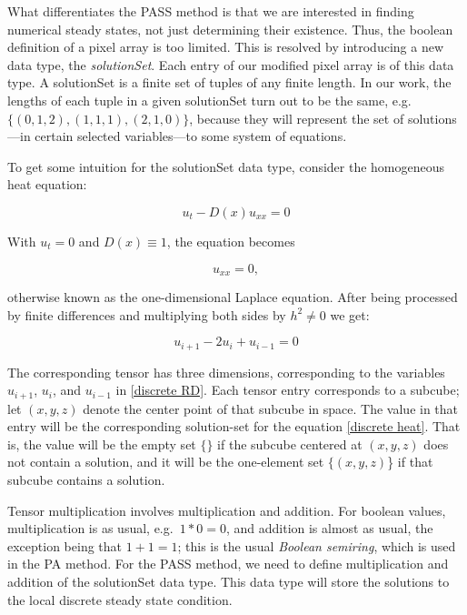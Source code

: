 \documentclass[11pt]{article}
\begin{document}
What differentiates the PASS method is that we are interested in finding numerical steady states, not just determining their existence. Thus, the boolean definition of a pixel array is too limited. This is resolved by introducing a new data type, the \textit{solutionSet}. Each entry of our modified pixel array is of this data type. A solutionSet is a finite set of tuples of any finite length. In our work, the lengths of each tuple in a given solutionSet turn out to be the same, e.g.\  $\{(0,1,2), (1,1,1), (2,1,0)\}$, because they will represent the set of solutions---in certain selected variables---to some system of equations.

To get some intuition for the solutionSet data type, consider the homogeneous heat equation:

\begin{equation}
    \label{general homogeneous heat}
    u_t - D(x)u_{xx} = 0
\end{equation}

\noindent With $u_t = 0$ and $D(x) \equiv 1$, the equation becomes

\begin{equation}
    \label{homogeneous heat}
    u_{xx} = 0,
\end{equation}

\noindent otherwise known as the one-dimensional Laplace equation. After being processed by finite differences and multiplying both sides by $h^2 \ne 0$ we get: 

\begin{equation}
    \label{discrete heat}
    u_{i+1} - 2u_i + u_{i-1} = 0
\end{equation}

\noindent The corresponding tensor has three dimensions, corresponding to the variables $u_{i+1}$, $u_i$, and $u_{i-1}$ in \cref{discrete RD}. Each tensor entry corresponds to a subcube; let $(x,y,z)$ denote the center point of that subcube in space. The value in that entry will be the corresponding solution-set for the equation \cref{discrete heat}. That is, the value will be the empty set $\{\}$ if the subcube centered at $(x,y,z)$ does not contain a solution, and it will be the one-element set $\{(x,y,z)$\} if that subcube contains a solution.

Tensor multiplication involves multiplication and addition. For boolean values, multiplication is as usual, e.g.\ $1*0=0$, and addition is almost as usual, the exception being that $1+1=1$; this is the usual \emph{Boolean semiring}, which is used in the PA method. For the PASS method, we need to define multiplication and addition of the solutionSet data type. This data type will store the solutions to the local discrete steady state condition.
\end{document}
